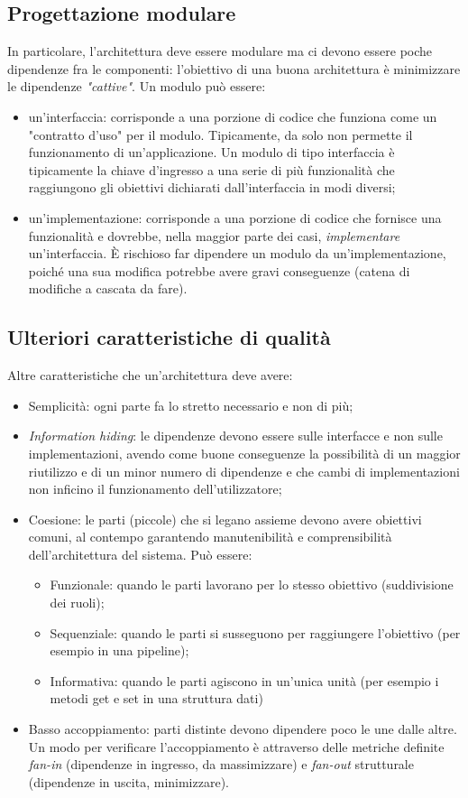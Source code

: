 \documentclass[../main]{subfiles}
\begin{document}
\subsection{Progettazione modulare}
In particolare, l'architettura deve essere modulare ma ci devono essere poche dipendenze fra le componenti: l'obiettivo di una buona architettura è minimizzare le dipendenze \textit{"cattive"}. Un modulo può essere:
\begin{itemize}
    \item un'interfaccia: corrisponde a una porzione di codice che funziona come un "contratto d'uso" per il modulo. Tipicamente, da solo non permette il funzionamento di un'applicazione. Un modulo di tipo interfaccia è tipicamente la chiave d'ingresso a una serie di più funzionalità che raggiungono gli obiettivi dichiarati dall'interfaccia in modi diversi;
    \item un'implementazione: corrisponde a una porzione di codice che fornisce una funzionalità e dovrebbe, nella maggior parte dei casi, \textit{implementare} un'interfaccia. È rischioso far dipendere un modulo da un'implementazione, poiché una sua modifica potrebbe avere gravi conseguenze (catena di modifiche a cascata da fare).
\end{itemize}
\subsection{Ulteriori caratteristiche di qualità}
Altre caratteristiche che un'architettura deve avere:
\begin{itemize}
    \item Semplicità: ogni parte fa lo stretto necessario e non di più;
    \item \textit{Information hiding}: le dipendenze devono essere sulle interfacce e non sulle implementazioni, avendo come buone conseguenze la possibilità di un maggior riutilizzo e di un minor numero di dipendenze e che cambi di implementazioni non inficino il funzionamento dell'utilizzatore;
    \item Coesione: le parti (piccole) che si legano assieme devono avere obiettivi comuni, al contempo garantendo manutenibilità e comprensibilità dell'architettura del sistema. Può essere:
    \begin{itemize}
        \item Funzionale: quando le parti lavorano per lo stesso obiettivo (suddivisione dei ruoli);
        \item Sequenziale: quando le parti si susseguono per raggiungere l'obiettivo (per esempio in una pipeline);
        \item Informativa: quando le parti agiscono in un'unica unità (per esempio i metodi get e set in una struttura dati)
    \end{itemize}
    \item Basso accoppiamento: parti distinte devono dipendere poco le une dalle altre. Un modo per verificare l'accoppiamento è attraverso delle metriche definite \textit{fan-in} (dipendenze in ingresso, da massimizzare) e \textit{fan-out} strutturale (dipendenze in uscita, minimizzare).
\end{itemize}
\end{document}
